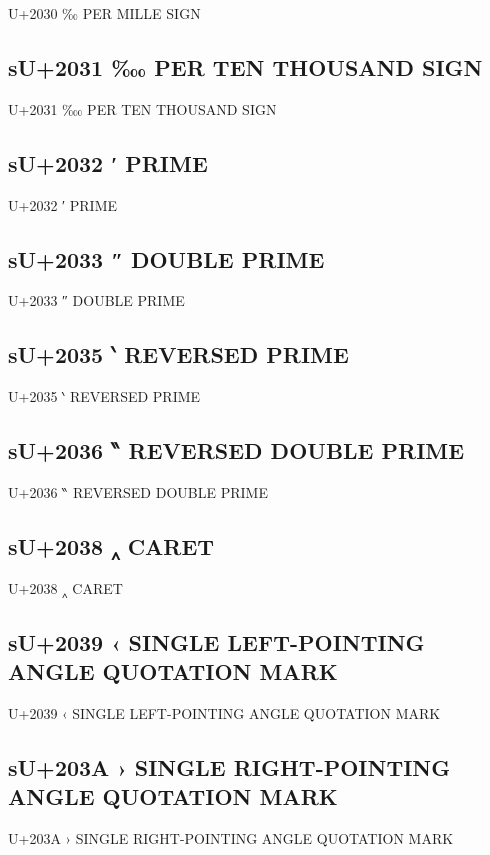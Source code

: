 U+2030 ‰  PER MILLE SIGN

\subsection{sU+2031 ‱  PER TEN THOUSAND SIGN}

U+2031 ‱  PER TEN THOUSAND SIGN

\subsection{sU+2032 ′ PRIME}

U+2032 ′ PRIME

\subsection{sU+2033 ″ DOUBLE PRIME}

U+2033 ″ DOUBLE PRIME

\subsection{sU+2035 ‵ REVERSED PRIME}

U+2035 ‵ REVERSED PRIME

\subsection{sU+2036 ‶ REVERSED DOUBLE PRIME}

U+2036 ‶ REVERSED DOUBLE PRIME

\subsection{sU+2038 ‸ CARET}

U+2038 ‸ CARET

\subsection{sU+2039 ‹  SINGLE LEFT-POINTING ANGLE QUOTATION MARK}

U+2039 ‹  SINGLE LEFT-POINTING ANGLE QUOTATION MARK

\subsection{sU+203A ›  SINGLE RIGHT-POINTING ANGLE QUOTATION MARK}

U+203A ›  SINGLE RIGHT-POINTING ANGLE QUOTATION MARK

